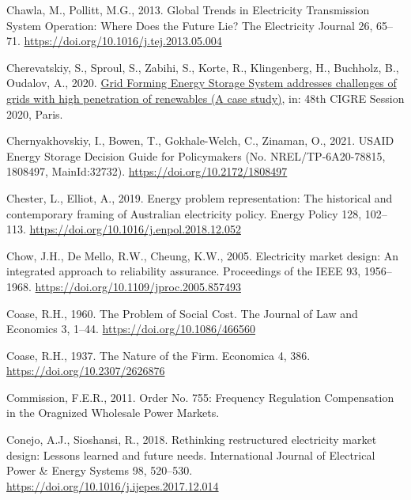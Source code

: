 \documentclass[12pt,a4paper,]{report}
\newlength{\cslhangindent}
\newenvironment{CSLReferences}[2] %
 {%
  \setlength{\parindent}{0pt}
  \ifodd #1 \everypar{\setlength{\hangindent}{\cslhangindent}}\ignorespaces\fi
  \ifnum #2 > 0
  \setlength{\parskip}{#2\baselineskip}
  \fi
 }%
 {}
\begin{document}
\begin{CSLReferences}{1}{0}
\leavevmode{}%
Chawla, M., Pollitt, M.G., 2013. Global {Trends} in {Electricity
Transmission System Operation}: {Where Does} the {Future Lie}? The
Electricity Journal 26, 65--71.
\url{https://doi.org/10.1016/j.tej.2013.05.004}

\leavevmode{}%
Cherevatskiy, S., Sproul, S., Zabihi, S., Korte, R., Klingenberg, H.,
Buchholz, B., Oudalov, A., 2020.
\href{https://e-cigre.org/publication/SESSION2020_C2-C6-322}{Grid
{Forming Energy Storage System} addresses challenges of grids with high
penetration of renewables ({A} case study)}, in: 48th {CIGRE Session}
2020, {Paris}.

\leavevmode{}%
Chernyakhovskiy, I., Bowen, T., Gokhale-Welch, C., Zinaman, O., 2021.
{USAID Energy Storage Decision Guide} for {Policymakers} (No.
NREL/TP-6A20-78815, 1808497, MainId:32732).
\url{https://doi.org/10.2172/1808497}

\leavevmode{}%
Chester, L., Elliot, A., 2019. Energy problem representation: {The}
historical and contemporary framing of {Australian} electricity policy.
Energy Policy 128, 102--113.
\url{https://doi.org/10.1016/j.enpol.2018.12.052}

\leavevmode{}%
Chow, J.H., De Mello, R.W., Cheung, K.W., 2005. Electricity market
design: {An} integrated approach to reliability assurance. Proceedings
of the IEEE 93, 1956--1968.
\url{https://doi.org/10.1109/jproc.2005.857493}

\leavevmode{}%
Coase, R.H., 1960. The {Problem} of {Social Cost}. The Journal of Law
and Economics 3, 1--44. \url{https://doi.org/10.1086/466560}

\leavevmode{}%
Coase, R.H., 1937. The {Nature} of the {Firm}. Economica 4, 386.
\url{https://doi.org/10.2307/2626876}

\leavevmode{}%
Commission, F.E.R., 2011. Order {No}. 755: {Frequency Regulation
Compensation} in the {Oragnized Wholesale Power Markets}.

\leavevmode{}%
Conejo, A.J., Sioshansi, R., 2018. Rethinking restructured electricity
market design: {Lessons} learned and future needs. International Journal
of Electrical Power \& Energy Systems 98, 520--530.
\url{https://doi.org/10.1016/j.ijepes.2017.12.014}


\end{CSLReferences}
\end{document}
